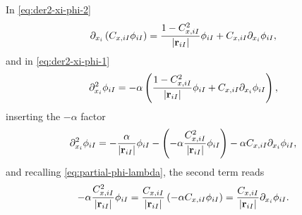 In \cref{eq:der2-xi-phi-2}
\begin{equation} \label{eq:partial-xiXI-riI-1}
    \partial_{x_i}
    \left(
        C_{x,iI}
        \phi_{iI}
    \right)
    =
    \frac{
        1 - C_{x,iI}^{2}
    }{
        \left| \boldsymbol{\mathrm{r}}_{iI} \right|
    }
    \phi_{iI}
    +
    C_{x,iI}
    \partial_{x_i}
    \phi_{iI}
    ,
\end{equation}
and in \cref{eq:der2-xi-phi-1} 
\begin{equation}
    \partial_{x_{i}}^{2} \phi_{iI}
    =
    -\alpha
    \left( 
        \frac{
            1 - C_{x,iI}^{2}
        }{
            \left| \boldsymbol{\mathrm{r}}_{iI} \right|
        }
        \phi_{iI}
        +
        C_{x,iI}
        \partial_{x_i}
        \phi_{iI}
    \right)
    ,
\end{equation}
inserting the $-\alpha$ factor 
\begin{equation} \label{eq:der2-xi-phi-3}
    \partial_{x_{i}}^{2} \phi_{iI}
    =
    -
    \frac{
        \alpha
    }{
        \left| \boldsymbol{\mathrm{r}}_{iI} \right|
    }
    \phi_{iI}
    -
    \left( 
        -\alpha
        \frac{
            C_{x,iI}^{2}
        }{
            \left| \boldsymbol{\mathrm{r}}_{iI} \right|
        }
        \phi_{iI}
    \right)
    - \alpha
    C_{x,iI}
    \partial_{x_i}
    \phi_{iI}
    ,
\end{equation}
and recalling \cref{eq:partial-phi-lambda}, the second term reads
\begin{equation}
    -\alpha
    \frac{
        C_{x,iI}^{2}
    }{
        \left| \boldsymbol{\mathrm{r}}_{iI} \right|
    }
    \phi_{iI}
    =
    \frac{
        C_{x,iI}
    }{
        \left| \boldsymbol{\mathrm{r}}_{iI} \right|
    }
    \left(
        - \alpha
        C_{x,iI}
        \phi_{iI}
    \right)
    =
    \frac{
        C_{x,iI}
    }{
        \left| \boldsymbol{\mathrm{r}}_{iI} \right|
    }
    \partial_{x_{i}} \phi_{iI}
    .
\end{equation}


